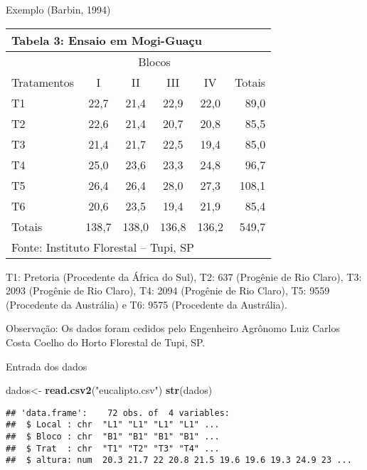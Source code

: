 \documentclass[
  ignorenonframetext,
]{beamer}
\newenvironment{Shaded}{\begin{snugshade}}{\end{snugshade}}
\newcommand{\FunctionTok}[1]{\textcolor[rgb]{0.13,0.29,0.53}{\textbf{#1}}}
\newcommand{\NormalTok}[1]{#1}
\newcommand{\OtherTok}[1]{\textcolor[rgb]{0.56,0.35,0.01}{#1}}
\newcommand{\StringTok}[1]{\textcolor[rgb]{0.31,0.60,0.02}{#1}}
\begin{document}
\begin{frame}{Exemplo (Barbin, 1994)}
\protect\hypertarget{exemplo-barbin-1994-2}{}
\begin{center}
\begin{tabular}{lccccr} 
\multicolumn{6}{l}{Tabela 3: Ensaio em Mogi-Guaçu}\\ \hline
 & \multicolumn{4}{c}{Blocos} & \\ \cline{2-5}
Tratamentos &   I & II &    III &   IV  & Totais \\ \hline
T1 &    22,7 &  21,4 &  22,9 &  22,0 &  89,0\\
T2 &    22,6 &  21,4 &  20,7 &  20,8 &  85,5\\
T3 &    21,4 &  21,7 &  22,5 &  19,4 &  85,0\\
T4 &    25,0 &  23,6 &  23,3 &  24,8 &  96,7\\
T5 &    26,4 &  26,4 &  28,0 &  27,3 &  108,1\\
T6 &    20,6 &  23,5 &  19,4 &  21,9 &  85,4\\
Totais &    138,7 & 138,0 & 136,8 & 136,2 & 549,7\\ \hline
\multicolumn{6}{l}{Fonte: Instituto Florestal – Tupi, SP}\\
\end{tabular}
\end{center}

T1: Pretoria (Procedente da África do Sul), T2: 637 (Progênie de Rio
Claro), T3: 2093 (Progênie de Rio Claro), T4: 2094 (Progênie de Rio
Claro), T5: 9559 (Procedente da Austrália) e T6: 9575 (Procedente da
Austrália).

Observação: Os dados foram cedidos pelo Engenheiro Agrônomo Luiz Carlos
Costa Coelho do Horto Florestal de Tupi, SP.
\end{frame}

\begin{frame}[fragile]{Entrada dos dados}
\protect\hypertarget{entrada-dos-dados}{}
\begin{Shaded}
\begin{Highlighting}[]
\NormalTok{dados}\OtherTok{\textless{}{-}} \FunctionTok{read.csv2}\NormalTok{(}\StringTok{"eucalipto.csv"}\NormalTok{)}
\FunctionTok{str}\NormalTok{(dados)}
\end{Highlighting}
\end{Shaded}

\begin{verbatim}
## 'data.frame':    72 obs. of  4 variables:
##  $ Local : chr  "L1" "L1" "L1" "L1" ...
##  $ Bloco : chr  "B1" "B1" "B1" "B1" ...
##  $ Trat  : chr  "T1" "T2" "T3" "T4" ...
##  $ altura: num  20.3 21.7 22 20.8 21.5 19.6 19.6 19.3 24.9 23 ...
\end{verbatim}
\end{frame}
\end{document}
